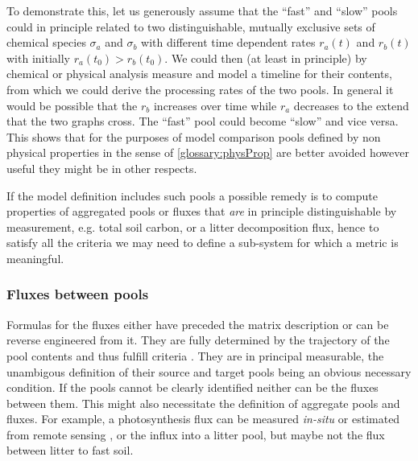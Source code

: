 To demonstrate this, let us generously assume that the ``fast'' and ``slow'' pools could in principle related to two distinguishable, mutually exclusive sets of chemical species $\sigma_a$ and $\sigma_b$ with different time dependent rates $r_a(t)$ and $r_b(t)$ with initially $r_a(t_0) > r_b(t_0)$. 
We could then (at least in principle) by chemical or physical analysis measure and model a timeline for their contents, from which we could derive the processing rates of the two pools.
In general it would be possible that the $r_b$ increases over time while $r_a$ decreases to the extend that the two graphs cross. 
The ``fast'' pool could become ``slow'' and vice versa.
This shows that for the purposes of model comparison pools defined by non physical properties in the sense of \ref{glossary:physProp} are better avoided however useful they might be in other respects. 

If the model definition includes such pools a possible remedy is to compute properties of 
aggregated pools or fluxes that \emph{are} in principle distinguishable by measurement, e.g. total soil carbon,
or a litter decomposition flux, hence to satisfy all the criteria we may need
to define a sub-system for which a metric is meaningful.   

\subsubsection{Fluxes between pools}
Formulas for the fluxes  either have preceded the matrix description or can be reverse engineered from it. They are fully determined by the trajectory of the pool contents and thus fulfill criteria .
They are in principal measurable, the unambigous definition of their source and target pools being an obvious necessary condition. If the pools cannot be clearly identified neither can be the fluxes between them. 
This might also necessitate the definition of aggregate pools and fluxes.
For example, a photosynthesis flux can be measured \textit{in-situ} or estimated from remote sensing \cite{jez_emerging_2021, sun_remotely_2023}, or the influx into a litter pool, but maybe not the flux between litter to fast soil.

